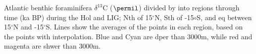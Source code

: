 Atlantic benthic foraminifera $\delta^{13}$C ($\permil$) divided by into regions through time (ka BP) during the Hol and LIG; Nth of 15$^\circ$N, Sth of -15$\circ$S, and eq between 15$^\circ$N and -15$^\circ$S. Lines show the averages of the points in each region, based on the points with interpolation. Blue and Cyan are dper than 3000m, while red and magenta are shwer than 3000m.